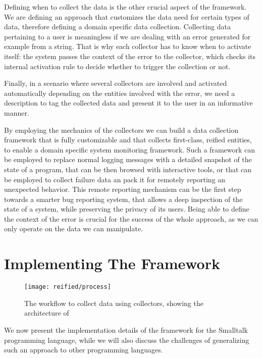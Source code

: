 Defining when to collect the data is the other crucial aspect of the framework.
We are defining an approach that customizes the data need for certain types of data, therefore defining a domain specific data collection.
Collecting data pertaining to a user is meaningless if we are dealing with an error generated for example from a string.
That is why each collector has to know when to activate itself: the system passes the context of the error to the collector, which checks its internal activation rule to decide whether to trigger the collection or not.

Finally, in a scenario where several collectors are involved and activated automatically depending on the entities involved with the error, we need a description to tag the collected data and present it to the user in an informative manner.

By employing the mechanics of the collectors we can build a data collection framework that is fully customizable and that collects first-class, reified entities, to enable a domain specific system monitoring framework.
Such a framework can be employed to replace normal logging messages with a detailed snapshot of the state of a program, that can be then browsed with interactive tools, or that can be employed to collect failure data an pack it for remotely reporting an unexpected behavior.
This remote reporting mechanism can be the first step towards a smarter bug reporting system, that allows a deep inspection of the state of a system, while preserving the privacy of its users.
Being able to define the context of the error is crucial for the success of the whole approach, as we can only operate on the data we can manipulate.


\section{Implementing The Framework} \label{sec:reified-implementation}

\begin{figure*}[ht]
  \centering
  \texttt{[image: reified/process]}
  \caption{The workflow to collect data using collectors, showing the architecture of \sln}
  \label{fig:architecture}
\end{figure*}

We now present the implementation details of the framework for the Smalltalk programming language, while  we will also discuss the challenges of generalizing such an approach to other programming languages.

